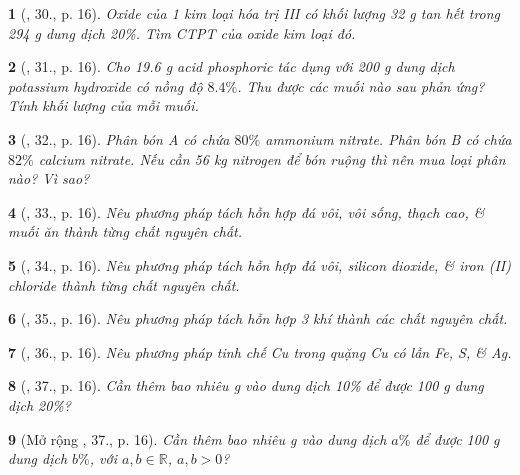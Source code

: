 \documentclass{article}
\newtheorem{baitoan}{}
\begin{document}
\begin{baitoan}[\cite{An_400_BT_Hoa_Hoc_9}, 30., p. 16]
	Oxide của 1 kim loại hóa trị III có khối lượng {\rm32 g} tan hết trong {\rm294 g} dung dịch {\rm{} 20\%}. Tìm {\rm CTPT} của oxide kim loại đó.
\end{baitoan}

\begin{baitoan}[\cite{An_400_BT_Hoa_Hoc_9}, 31., p. 16]
	Cho {\rm19.6 g} acid phosphoric tác dụng với {\rm200 g} dung dịch potassium hydroxide có nồng độ $8.4\%$. Thu được các muối nào sau phản ứng? Tính khối lượng của mỗi muối.
\end{baitoan}

\begin{baitoan}[\cite{An_400_BT_Hoa_Hoc_9}, 32., p. 16]
	Phân bón A có chứa $80\%$ ammonium nitrate. Phân bón B có chứa $82\%$ calcium nitrate. Nếu cần {\rm56 kg} nitrogen để bón ruộng thì nên mua loại phân nào? Vì sao?
\end{baitoan}

\begin{baitoan}[\cite{An_400_BT_Hoa_Hoc_9}, 33., p. 16]
	Nêu phương pháp tách hỗn hợp đá vôi, vôi sống, thạch cao, \& muối ăn thành từng chất nguyên chất.
\end{baitoan}

\begin{baitoan}[\cite{An_400_BT_Hoa_Hoc_9}, 34., p. 16]
	Nêu phương pháp tách hỗn hợp đá vôi, silicon dioxide, \& iron (II) chloride thành từng chất nguyên chất.
\end{baitoan}

\begin{baitoan}[\cite{An_400_BT_Hoa_Hoc_9}, 35., p. 16]
	Nêu phương pháp tách hỗn hợp 3 khí {\rm{}} thành các chất nguyên chất.
\end{baitoan}

\begin{baitoan}[\cite{An_400_BT_Hoa_Hoc_9}, 36., p. 16]
	Nêu phương pháp tinh chế {\rm Cu} trong quặng {\rm Cu} có lẫn {\rm Fe, S}, \& {\rm Ag}.
\end{baitoan}

\begin{baitoan}[\cite{An_400_BT_Hoa_Hoc_9}, 37., p. 16]
	Cần thêm bao nhiêu {\rm g } vào dung dịch {\rm{} 10\%} để được {\rm100 g} dung dịch {\rm{} 20\%}?
\end{baitoan}

\begin{baitoan}[Mở rộng \cite{An_400_BT_Hoa_Hoc_9}, 37., p. 16]
	Cần thêm bao nhiêu {\rm g } vào dung dịch {\rm{} $a\%$} để được {\rm100 g} dung dịch {\rm{} $b\%$}, với $a,b\in\mathbb{R}$, $a,b > 0$?
\end{baitoan}
\end{document}
